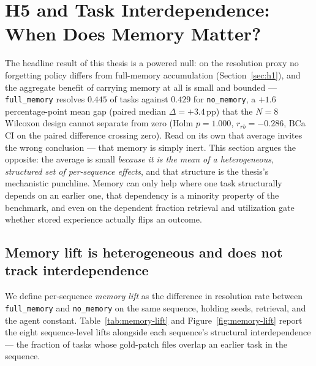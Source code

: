 

\section{H5 and Task Interdependence: When Does Memory Matter?}
\label{sec:h5}

The headline result of this thesis is a powered null: on the resolution proxy no forgetting
policy differs from full-memory accumulation (Section~\ref{sec:h1}), and the aggregate
benefit of carrying memory at all is small and bounded --- \texttt{full\_memory} resolves
$0.445$ of tasks against $0.429$ for \texttt{no\_memory}, a $+1.6$ percentage-point mean gap
(paired median $\Delta = +3.4$\,pp) that the $N=8$ Wilcoxon design cannot separate from zero
(Holm $p = 1.000$, $r_{rb} = -0.286$, BCa CI on the paired difference crossing zero). Read on
its own that average invites the wrong conclusion --- that memory is simply inert. This
section argues the opposite: the average is small \emph{because it is the mean of a
heterogeneous, structured set of per-sequence effects}, and that structure is the
thesis's mechanistic punchline. Memory can only help where one task structurally depends on
an earlier one, that dependency is a minority property of the benchmark, and even on the
dependent fraction retrieval and utilization gate whether stored experience actually flips
an outcome.

\subsection{Memory lift is heterogeneous and does not track interdependence}

We define per-sequence \emph{memory lift} as the difference in resolution rate between
\texttt{full\_memory} and \texttt{no\_memory} on the same sequence, holding seeds, retrieval,
and the agent constant. Table~\ref{tab:memory-lift} and Figure~\ref{fig:memory-lift} report
the eight sequence-level lifts alongside each sequence's structural interdependence --- the
fraction of tasks whose gold-patch files overlap an earlier task in the sequence.

